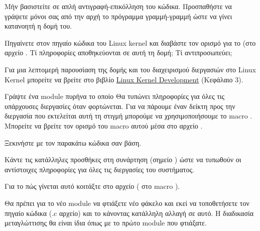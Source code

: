 \documentclass[18pt]{extarticle}
\begin{document}
\begin{info}[Σημείωση:]
Μήν βασιστείτε σε απλή αντιγραφή-επικόλληση του κώδικα.                                                                        
Προσπαθήστε να γράψετε μόνοι σας από την αρχή το πρόγραμμα γραμμή-γραμμή ώστε να γίνει κατανοητή η δομή του.                                 
\end{info}

\begin{question}
Πηγαίνετε στον πηγαίο κώδικα του Linux kernel και διαβάστε τον ορισμό για το  (στο αρχείο .
Τί πληροφορίες αποθηκεύονται σε αυτή τη δομή; Τί αντιπροσωπεύει;

\begin{info}[Σημείωση:]
    Για μια λεπτομερή παρουσίαση της δομής  και του διαχειρισμού διεργασιών 
    στο Linux Kernel μπορείτε να βρείτε στο βιβλίο \href{https://www.doc-developpement-durable.org/file/Projets-informatiques/cours-&-manuels-informatiques/Linux/Linux\%20Kernel\%20Development,\%203rd\%20Edition.pdf}{Linux Kernel Development}
    (Κεφάλαιο 3).
\end{info}
\end{question}

\begin{question}
Γράψτε ένα module πυρήνα το οποίο Θα τυπώνει πληροφορίες για όλες τις υπάρχουσες διεργασίες όταν φορτώνεται.
Για να πάρουμε έναν δείκτη προς την διεργασία που εκτελείται αυτή τη στιγμή μπορούμε να χρησιμοποιήσουμε
το macro . Μπορείτε να βρείτε τον ορισμό του macro αυτού μέσα στο αρχείο .

Ξεκινήστε με τον παρακάτω κώδικα σαν βάση.

Κάντε τις κατάλληλες προσθήκες στη συνάρτηση  (σημείο ) ώστε να τυπωθούν οι αντίστοιχες πληροφορίες για όλες τις διεργασίες του συστήματος. 

Για το πώς γίνεται αυτό κοιτάξτε στο αρχείο ( στο macro ).

\begin{file}
    \footnotesize 
\end{file}

\begin{info}[Σημείωση]
Θα πρέπει για το νέο module να φτιάξετε νέο φάκελο και εκεί
να τοποθετήσετε τον πηγαίο κώδικα (.c αρχείο) και το  κάνοντας κατάλληλη αλλαγή σε αυτό. 
Η διαδικασία μεταγλώττισης θα είναι ίδια όπως με το πρώτο module που φτιάξατε.
\end{info}

\end{question}
\end{document}
